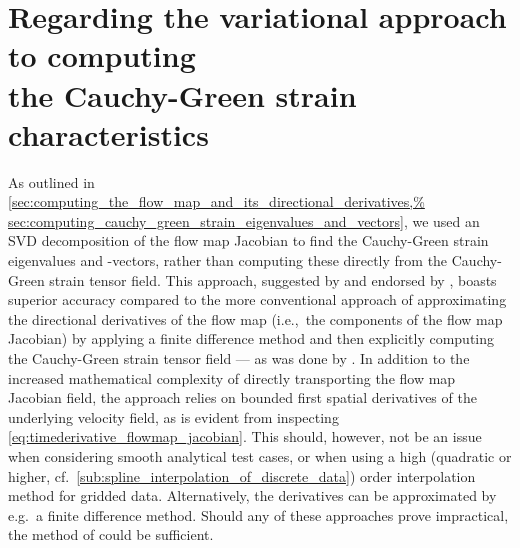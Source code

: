 \section[Regarding the variational approach to computing the Cauchy-Green
strain characteristics] {Regarding the variational approach to computing
\\\phantom{4.1} the Cauchy-Green strain characteristics}
\label{sec:regarding_the_variational_approach_to_computing_the_cauchy_green%
_strain_characteristics}

As outlined in
\cref{sec:computing_the_flow_map_and_its_directional_derivatives,%
sec:computing_cauchy_green_strain_eigenvalues_and_vectors}, we used an
SVD decomposition of the flow map Jacobian to find the Cauchy-Green strain
eigenvalues and -vectors, rather than computing these directly from the
Cauchy-Green strain tensor field. This approach, suggested by
\textcite{miron2012anisotropic} and endorsed by
\textcite{oettinger2016autonomous}, boasts superior accuracy compared to the
more conventional approach of approximating the directional derivatives of the
flow map (i.e.,\ the components of the flow map Jacobian) by applying a finite
difference method and then explicitly computing the Cauchy-Green strain
tensor field --- as was done by \textcite{farazmand2012computing}. In addition
to the increased mathematical complexity of directly transporting the flow map
Jacobian field, the approach relies on bounded first spatial derivatives of the
underlying velocity field, as is evident from inspecting
\cref{eq:timederivative_flowmap_jacobian}. This should, however, not be an issue
when considering smooth analytical test cases, or when using a high (quadratic
or higher, cf.\ \cref{sub:spline_interpolation_of_discrete_data}) order
interpolation method for gridded data. Alternatively, the derivatives can be
approximated by e.g.\ a finite difference method. Should any of these
approaches prove impractical, the method of \textcite{farazmand2012computing}
could be sufficient.




